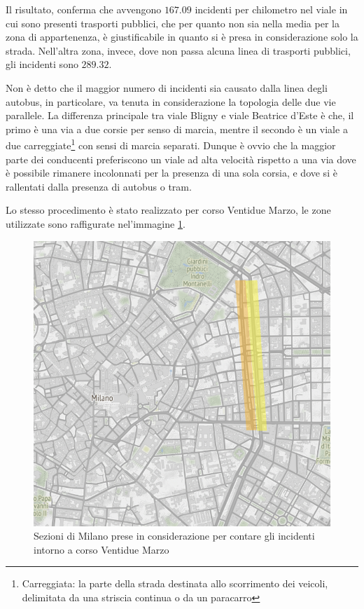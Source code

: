 \documentclass[a4paper]{report}
\begin{document}
Il risultato, conferma che avvengono $167.09$ incidenti per chilometro 
nel viale in cui sono presenti trasporti pubblici, che per quanto non sia nella media per la zona 
di appartenenza, è giustificabile in quanto si è presa in considerazione solo la strada.
Nell'altra zona, invece, dove non passa alcuna linea di trasporti pubblici, 
gli incidenti sono $289.32$. 

Non è detto che il maggior numero di incidenti sia causato dalla linea degli autobus, 
in particolare, va tenuta in considerazione la topologia delle due vie parallele.
La differenza principale tra viale Bligny e viale Beatrice d'Este è che, il primo è una via a due 
corsie per senso di marcia, mentre il secondo è un viale a due 
carreggiate\footnote{Carreggiata: la parte della strada destinata allo scorrimento dei veicoli, 
delimitata da una striscia continua o da un paracarro} 
con sensi di marcia separati. 
Dunque è ovvio che la maggior parte dei conducenti preferiscono un viale ad alta velocità rispetto a 
una via dove è possibile rimanere incolonnati per la presenza di una sola corsia, e dove si è 
rallentati dalla presenza di autobus o tram.

Lo stesso procedimento è stato realizzato per corso Ventidue Marzo, le zone utilizzate sono 
raffigurate nel'immagine \ref{fig:zona-22marzo-rect}. 

\begin{figure}
    \includegraphics[width=\linewidth]{../src/atm/zona_22marzo_rect.png}
    \caption{Sezioni di Milano prese in considerazione per contare gli incidenti intorno a corso Ventidue Marzo}
    \label{fig:zona-22marzo-rect}
\end{figure}
\end{document}
